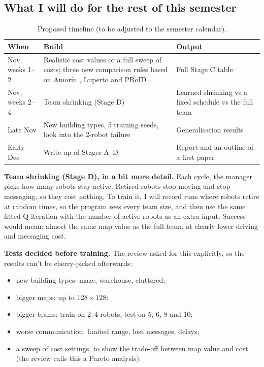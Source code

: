 \documentclass[11pt,a4paper]{article}
\begin{document}
\subsection{What I will do for the rest of this semester}

\begin{table}[h]
\centering
\small
\begin{tabularx}{\linewidth}{lXX}
\toprule
When & Build & Output \\
\midrule
Nov, weeks 1--2 & Realistic cost values or a full sweep of costs; three new comparison rules based on Amorín \cite{amorin2019}, Luperto \cite{luperto2026} and PRoID \cite{kim2026proid} & Full Stage C table \\
Nov, weeks 2--4 & Team shrinking (Stage D) & Learned shrinking vs a fixed schedule vs the full team \\
Late Nov & New building types, 5 training seeds, look into the 2-robot failure & Generalisation results \\
Early Dec & Write-up of Stages A--D & Report and an outline of a first paper \\
\bottomrule
\end{tabularx}
\caption{Proposed timeline (to be adjusted to the semester calendar).}
\end{table}

\textbf{Team shrinking (Stage D), in a bit more detail.} Each cycle, the manager picks how many robots stay active. Retired robots stop moving and stop messaging, so they cost nothing. To train it, I will record runs where robots retire at random times, so the program sees every team size, and then use the same fitted Q-iteration with the number of active robots as an extra input. Success would mean: almost the same map value as the full team, at clearly lower driving and messaging cost.

\textbf{Tests decided before training.} The review asked for this explicitly, so the results can't be cherry-picked afterwards:
\begin{itemize}
  \item new building types: maze, warehouse, cluttered;
  \item bigger maps: up to $128\times128$;
  \item bigger teams: train on 2--4 robots, test on 5, 6, 8 and 10;
  \item worse communication: limited range, lost messages, delays;
  \item a sweep of cost settings, to show the trade-off between map value and cost (the review calls this a Pareto analysis).
\end{itemize}
\end{document}
